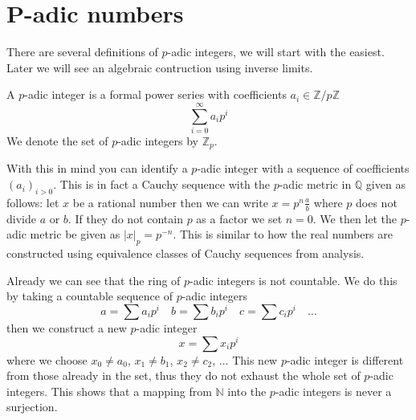 \section{P-adic numbers}
There are several definitions of $p$-adic integers, we will start with the easiest. Later we
will see an algebraic contruction using inverse limits.
\begin{mydef}
 A $p$-adic integer is a formal power series with coefficients $a_i \in \mathbb{Z}/p\mathbb{Z}$
$$ \sum_{i=0}^{\infty} a_i p^i $$
We denote the set of $p$-adic integers by $\mathbb{Z}_p$.
\end{mydef}
With this in mind you can identify a $p$-adic integer with a sequence of coefficients
$(a_i)_{i > 0}$. This is in fact a Cauchy sequence with the $p$-adic metric in $\mathbb{Q}$ given as follows:
let $x$ be a rational number then we can write $x = p^n \frac{a}{b}$ where $p$ does not divide $a$ or $b$.
If they do not contain $p$ as a factor we set $n=0$. We then let the $p$-adic metric be given as
$|x|_p = p^{-n}$. This is similar to how the real numbers are constructed using equivalence classes
of Cauchy sequences from analysis.

Already we can see that the ring of $p$-adic integers is not countable. We do this by taking
a countable sequence of $p$-adic integers
$$a = \sum a_i p^i \quad b = \sum b_i p^i \quad c = \sum c_i p^i \quad \ldots $$
then we construct a new $p$-adic integer
$$x = \sum x_i p^i $$
where we choose $x_0 \neq a_0$, $x_1 \neq b_1$, $x_2 \neq c_2$, $\ldots$
This new $p$-adic integer is different from those already in the set, thus they do not
exhaust the whole set of $p$-adic integers. This shows that a mapping from $\mathbb{N}$ into
the $p$-adic integers is never a surjection.

